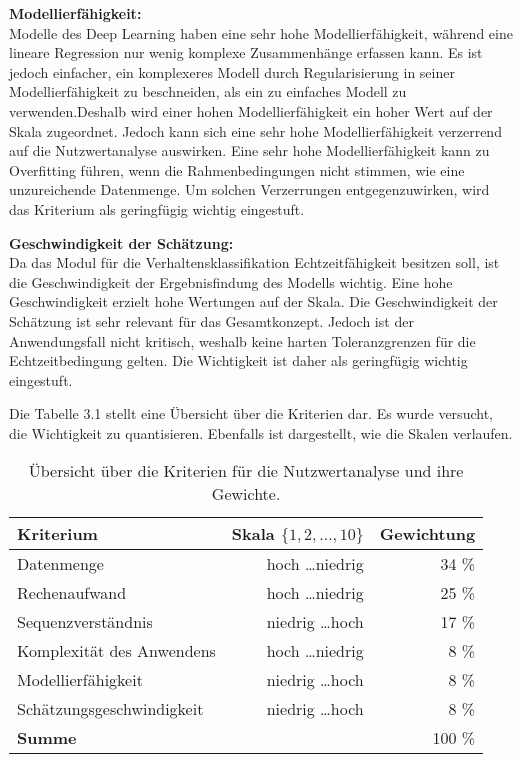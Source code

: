 \textbf{Modellierfähigkeit:}\\
Modelle des \gls{Deep Learning} haben eine sehr hohe Modellierfähigkeit, während eine lineare Regression nur wenig komplexe Zusammenhänge erfassen kann. Es ist jedoch einfacher, ein komplexeres Modell durch Regularisierung in seiner Modellierfähigkeit zu beschneiden, als ein zu einfaches Modell zu verwenden.Deshalb wird einer hohen Modellierfähigkeit ein hoher Wert auf der Skala zugeordnet. Jedoch kann sich eine sehr hohe Modellierfähigkeit verzerrend auf die Nutzwertanalyse auswirken. Eine sehr hohe Modellierfähigkeit kann zu \gls{Overfitting} führen, wenn die Rahmenbedingungen nicht stimmen, wie eine unzureichende Datenmenge. Um solchen Verzerrungen entgegenzuwirken, wird das Kriterium als geringfügig wichtig eingestuft. \par

\textbf{Geschwindigkeit der Schätzung:}\\
Da das \gls{Modul} für die Verhaltensklassifikation Echtzeitfähigkeit besitzen soll, ist die Geschwindigkeit der Ergebnisfindung des Modells wichtig. Eine hohe Geschwindigkeit erzielt hohe Wertungen auf der Skala. Die Geschwindigkeit der Schätzung ist sehr relevant für das Gesamtkonzept. Jedoch ist der Anwendungsfall nicht kritisch, weshalb keine harten Toleranzgrenzen für die Echtzeitbedingung gelten. Die Wichtigkeit ist daher als geringfügig wichtig eingestuft. \par

Die Tabelle 3.1 stellt eine Übersicht über die Kriterien dar. Es wurde versucht, die Wichtigkeit zu quantisieren. Ebenfalls ist dargestellt, wie die Skalen verlaufen.


\begin{table}[ht]
    \centering
    \begin{tabular}{|l|r|r|}
         \hline
         \textbf{Kriterium} & \textbf{Skala \(\{1,2,\dots,10\}\)} & \textbf{Gewichtung}\\
         \hline
         Datenmenge                     & hoch \dots niedrig            & 34 \%\\
         \hline
         Rechenaufwand                  & hoch \dots niedrig            & 25 \%\\
         \hline
         Sequenzverständnis             & niedrig \dots hoch            & 17 \%\\
         \hline
         Komplexität des Anwendens      & hoch \dots niedrig            & 8 \%\\
         \hline
         Modellierfähigkeit             & niedrig \dots hoch            & 8 \%\\
         \hline
         Schätzungsgeschwindigkeit      & niedrig \dots hoch            & 8 \%\\
         \hline
         \textbf{Summe}                 &                               & 100 \%\\
         \hline
    \end{tabular}
    \caption{Übersicht über die Kriterien für die Nutzwertanalyse und ihre Gewichte.}
    \label{tab:NWAKriterien}
\end{table}

